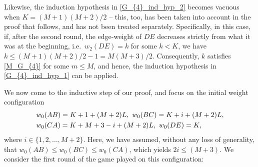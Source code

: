 \documentclass[11pt,reqno]{amsart}
\theoremstyle{definition}
\theoremstyle{definition}
\begin{document}
Likewise, the induction hypothesis in \eqref{G_{4}_ind_hyp_2} becomes vacuous when $K=(M+1)(M+2)/2$ -- this, too, has been taken into account in the proof that follows, and has not been treated separately. Specifically, in this case, if, after the second round, the edge-weight of $DE$ decreases strictly from what it was at the beginning, i.e.\ $w_{2}(DE)=k$ for some $k < K$, we have $k \leqslant (M+1)(M+2)/2-1=M(M+3)/2$. Consequently, $k$ satisfies \eqref{M_G_{4}} for some $m \leqslant M$, and hence, the induction hypothesis in \eqref{G_{4}_ind_hyp_1} can be applied.

We now come to the inductive step of our proof, and focus on the initial weight configuration
\begin{align}
{}&w_{0}(AB)=K+1+(M+2)L,\ w_{0}(BC)=K+i+(M+2)L,\nonumber\\
{}&w_{0}(CA)=K+M+3-i+(M+2)L,\ w_{0}(DE)=K,\label{G_{4}_losing_inductive_eq_1}
\end{align}
where $i \in \{1,2,\ldots,M+2\}$. Here, we have assumed, without any loss of generality, that $w_{0}(AB) \leqslant w_{0}(BC) \leqslant w_{0}(CA)$, which yields $2i \leqslant (M+3)$. We consider the first round of the game played on this configuration:
\end{document}
